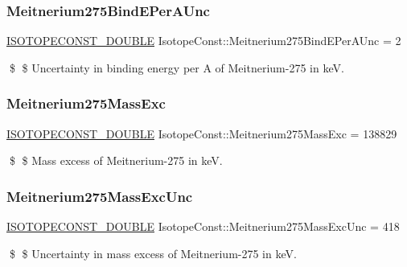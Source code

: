 \subsubsection{\texorpdfstring{Meitnerium275\+Bind\+E\+Per\+A\+Unc}{Meitnerium275BindEPerAUnc}}
{\footnotesize\ttfamily \mbox{\hyperlink{group___isotope_const-_macros_ga8f45a7272ce02c0b4c65c44636ed719a}{I\+S\+O\+T\+O\+P\+E\+C\+O\+N\+S\+T\+\_\+\+D\+O\+U\+B\+LE}} Isotope\+Const\+::\+Meitnerium275\+Bind\+E\+Per\+A\+Unc = 2}

\$ \$ Uncertainty in binding energy per A of Meitnerium-\/275 in keV. \mbox{\label{group___isotope_const-_meitnerium-_mt275_ga1232ce468596c86d8707b8801c8061ea}} 
\subsubsection{\texorpdfstring{Meitnerium275\+Mass\+Exc}{Meitnerium275MassExc}}
{\footnotesize\ttfamily \mbox{\hyperlink{group___isotope_const-_macros_ga8f45a7272ce02c0b4c65c44636ed719a}{I\+S\+O\+T\+O\+P\+E\+C\+O\+N\+S\+T\+\_\+\+D\+O\+U\+B\+LE}} Isotope\+Const\+::\+Meitnerium275\+Mass\+Exc = 138829}

\$ \$ Mass excess of Meitnerium-\/275 in keV. \mbox{\label{group___isotope_const-_meitnerium-_mt275_gaff6019384f382f42287326df6038b2cb}} 
\subsubsection{\texorpdfstring{Meitnerium275\+Mass\+Exc\+Unc}{Meitnerium275MassExcUnc}}
{\footnotesize\ttfamily \mbox{\hyperlink{group___isotope_const-_macros_ga8f45a7272ce02c0b4c65c44636ed719a}{I\+S\+O\+T\+O\+P\+E\+C\+O\+N\+S\+T\+\_\+\+D\+O\+U\+B\+LE}} Isotope\+Const\+::\+Meitnerium275\+Mass\+Exc\+Unc = 418}

\$ \$ Uncertainty in mass excess of Meitnerium-\/275 in keV. \mbox{\label{group___isotope_const-_meitnerium-_mt275_gae33fc22c6b18f8da5ea204ae23878c8c}} 
